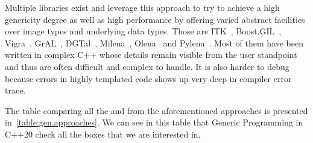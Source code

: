 Multiple libraries exist and leverage this approach to try to achieve a high genericity degree as well as high
performance by offering varied abstract facilities over image types and underlying data types. Those are
ITK~\parencite{johnson.2013.ITKSoftwareGuideThirdEdition}, Boost.GIL~\parencite{bourdev.2006.bgil},
Vigra~\parencite{kothe.2011.generic}, GrAL~\parencite{berti.2006.gral}, DGTal~\parencite{coeurjolly.2016.dgtal},
Milena~\parencite{levillain.2009.ismm,levillain.2010.icip},
Olena~\parencite{olena.2000.www,levillain.2011.phd,geraud.2012.hdr,levillain.2014.ciarp} and
Pylena~\parencite{carlinet.2018.pylena}. Most of them have been written in complex C++ whose details remain visible from
the user standpoint and thus are often difficult and complex to handle. It is also harder to debug because errors in
highly templated code shows up very deep in compiler error trace.

The table comparing all the \pros and \cons from the aforementioned approaches is presented
in~\cref{table:gen.approaches}. We can see in this table that Generic Programming in C++20 check all the boxes that we
are interested in.


